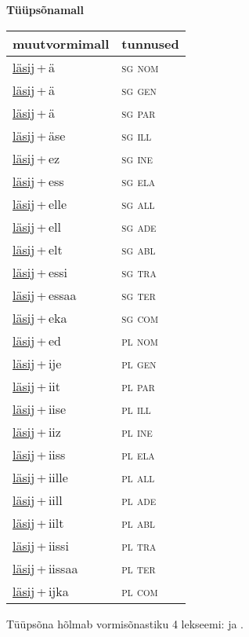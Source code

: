 
\vspace{1.8em}
\begin{minipage}{\textwidth}
\textbf{Tüüpsõnamall \,}\\

\begin{sideways}
\begin{tabular}{l l}
muutvormimall & tunnused \\
\hline
\underline{läsij}\,+\,ä & \textsc{ sg nom } \\
\underline{läsij}\,+\,ä & \textsc{ sg gen } \\
\underline{läsij}\,+\,ä & \textsc{ sg par } \\
\underline{läsij}\,+\,äse & \textsc{ sg ill } \\
\underline{läsij}\,+\,ez & \textsc{ sg ine } \\
\underline{läsij}\,+\,ess & \textsc{ sg ela } \\
\underline{läsij}\,+\,elle & \textsc{ sg all } \\
\underline{läsij}\,+\,ell & \textsc{ sg ade } \\
\underline{läsij}\,+\,elt & \textsc{ sg abl } \\
\underline{läsij}\,+\,essi & \textsc{ sg tra } \\
\underline{läsij}\,+\,essaa & \textsc{ sg ter } \\
\underline{läsij}\,+\,eka & \textsc{ sg com } \\
\underline{läsij}\,+\,ed & \textsc{ pl nom } \\
\underline{läsij}\,+\,ije & \textsc{ pl gen } \\
\underline{läsij}\,+\,iit & \textsc{ pl par } \\
\underline{läsij}\,+\,iise & \textsc{ pl ill } \\
\underline{läsij}\,+\,iiz & \textsc{ pl ine } \\
\underline{läsij}\,+\,iiss & \textsc{ pl ela } \\
\underline{läsij}\,+\,iille & \textsc{ pl all } \\
\underline{läsij}\,+\,iill & \textsc{ pl ade } \\
\underline{läsij}\,+\,iilt & \textsc{ pl abl } \\
\underline{läsij}\,+\,iissi & \textsc{ pl tra } \\
\underline{läsij}\,+\,iissaa & \textsc{ pl ter } \\
\underline{läsij}\,+\,ijka & \textsc{ pl com } \\
\end{tabular}
\end{sideways}
\label{tab:tüüpsõnamall-läsijä}

\end{minipage}

 
\vspace{1em}
\noindent Tüüpsõna hõlmab vormisõnastiku 4 lekseemi:  ja .
